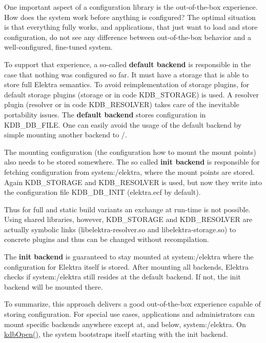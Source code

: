 One important aspect of a configuration library is the out-\/of-\/the-\/box experience. How does the system work before anything is configured? The optimal situation is that everything fully works, and applications, that just want to load and store configuration, do not see any difference between out-\/of-\/the-\/box behavior and a well-\/configured, fine-\/tuned system.

To support that experience, a so-\/called {\bfseries default backend} is responsible in the case that nothing was configured so far. It must have a storage that is able to store full Elektra semantics. To avoid reimplementation of storage plugins, for default storage plugins ({\ttfamily storage} or in code {\ttfamily K\+D\+B\+\_\+\+S\+T\+O\+R\+A\+GE}) is used. A resolver plugin ({\ttfamily resolver} or in code {\ttfamily K\+D\+B\+\_\+\+R\+E\+S\+O\+L\+V\+ER}) takes care of the inevitable portability issues. The {\bfseries default backend} stores configuration in {\ttfamily K\+D\+B\+\_\+\+D\+B\+\_\+\+F\+I\+LE}. One can easily avoid the usage of the default backend by simple mounting another backend to {\ttfamily /}.

The mounting configuration (the configuration how to mount the mount points) also needs to be stored somewhere. The so called {\bfseries init backend} is responsible for fetching configuration from {\ttfamily system\+:/elektra}, where the mount points are stored. Again {\ttfamily K\+D\+B\+\_\+\+S\+T\+O\+R\+A\+GE} and {\ttfamily K\+D\+B\+\_\+\+R\+E\+S\+O\+L\+V\+ER} is used, but now they write into the configuration file {\ttfamily K\+D\+B\+\_\+\+D\+B\+\_\+\+I\+N\+IT} ({\ttfamily elektra.\+ecf} by default).

Thus for full and static build variants an exchange at run-\/time is not possible. Using shared libraries, however, {\ttfamily K\+D\+B\+\_\+\+S\+T\+O\+R\+A\+GE} and {\ttfamily K\+D\+B\+\_\+\+R\+E\+S\+O\+L\+V\+ER} are actually symbolic links ({\ttfamily libelektra-\/resolver.\+so} and {\ttfamily libelektra-\/storage.\+so}) to concrete plugins and thus can be changed without recompilation.

The {\bfseries init backend} is guaranteed to stay mounted at {\ttfamily system\+:/elektra} where the configuration for Elektra itself is stored. After mounting all backends, Elektra checks if {\ttfamily system\+:/elektra} still resides at the default backend. If not, the init backend will be mounted there.

To summarize, this approach delivers a good out-\/of-\/the-\/box experience capable of storing configuration. For special use cases, applications and administrators can mount specific backends anywhere except at, and below, {\ttfamily system\+:/elektra}. On {\ttfamily \hyperlink{group__kdb_ga844e1299a84c3fbf1d3a905c5c893ba5}{kdb\+Open()}}, the system bootstraps itself starting with the init backend.


